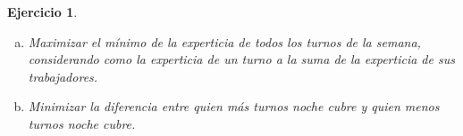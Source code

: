 \documentclass[a4paper,oneside,12pt]{amsart}
\newtheorem{quest}{Ejercicio}
\begin{document}
\begin{quest}
\begin{enumerate}
        \begin{enumerate}[a)]
            \item Maximizar el mínimo de la experticia de todos los turnos de la semana, considerando como la experticia de un turno a la suma de la experticia de sus trabajadores.
            \item Minimizar la diferencia entre quien más turnos noche cubre y quien menos turnos noche cubre.
        \end{enumerate}
    \end{enumerate}  
\end{quest}


\newpage

\end{document}
